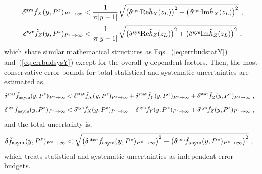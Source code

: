 \documentclass[a4paper,11pt]{article}
\begin{document}
\begin{align}\label{eq:errbudsysX}
\delta^{\rm sys} \tilde f_{X}(y,P^z)_{P^z \rightarrow\infty} < \frac{1}{\pi |y-1|} \sqrt{\left(\delta^{\rm sys}{\rm Re}\tilde{h}_{X}(z_L)\right)^2 + \left(\delta^{\rm sys}{\rm Im}\tilde{h}_{X}(z_L)\right)^2} \ ,
\end{align}
\begin{align}\label{eq:errbudsysZ}
\delta^{\rm sys} \tilde f_{Z}(y,P^z)_{P^z \rightarrow\infty} < \frac{1}{\pi |y+1|} \sqrt{\left(\delta^{\rm sys}{\rm Re}\tilde{h}_{Z}(z_L)\right)^2 + \left(\delta^{\rm sys}{\rm Im}\tilde{h}_{Z}(z_L)\right)^2} \ ,
\end{align}
which share similar mathematical structures as Eqs.~(\ref{eq:errbudstatY}) and~(\ref{eq:errbudsysY}) except for the overall $y$-dependent factors. 
Then, the most conservative error bounds for total statistical and systematic uncertainties are estimated as,
\begin{align}\label{eq:errbudstat}
&\delta^{\rm stat} \tilde f_{\rm asym}(y,P^z)_{P^z \rightarrow\infty} < \delta^{\rm stat} \tilde f_{X}(y,P^z)_{P^z \rightarrow\infty} + \delta^{\rm stat} \tilde f_{Y}(y,P^z)_{P^z \rightarrow\infty} + \delta^{\rm stat} \tilde f_{Z}(y,P^z)_{P^z \rightarrow\infty} \ ,
\end{align}
\begin{align}\label{eq:errbudsys}
&\delta^{\rm sys} \tilde f_{\rm asym}(y,P^z)_{P^z \rightarrow\infty} < \delta^{\rm sys} \tilde f_{X}(y,P^z)_{P^z \rightarrow\infty} + \delta^{\rm sys} \tilde f_{Y}(y,P^z)_{P^z \rightarrow\infty} + \delta^{\rm sys} \tilde f_{Z}(y,P^z)_{P^z \rightarrow\infty} \ ,
\end{align}
and the total uncertainty is,
\begin{align}\label{eq:errbud}
&\delta \tilde f_{\rm asym}(y,P^z)_{P^z \rightarrow\infty} < \sqrt{\left(\delta^{\rm stat} \tilde f_{\rm asym}(y,P^z)_{P^z \rightarrow\infty}\right)^2 + \left(\delta^{\rm sys} \tilde f_{\rm asym}(y,P^z)_{P^z \rightarrow\infty}\right)^2} \ ,    
\end{align}
which treats statistical and systematic uncertainties as independent error budgets. 
\end{document}

